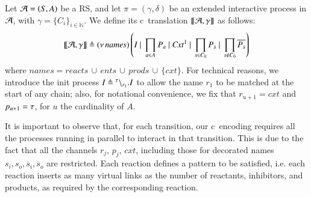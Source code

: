 \begin{definition}[Translation]
\label{def:trans}
Let ${\cal A} = (S, A)$ be a RS, and let $\pi=(\gamma,\delta)$ be an extended interactive process in ${\cal A}$, with  $\gamma=\{C_i\}_{i\in\mathbb{N}}$. 
We define its c\CNA~translation $\llbracket{\cal A},\gamma \rrbracket$ as follows: 
$$
\llbracket{\cal A},\gamma \rrbracket 
\triangleq
 (\nu\, \mathit{names})\left(I ~|~ \prod_{a\in A} P_a ~|~  \mathit{Cxt}^1 ~|~\prod_{s\in C_0}P_{s} ~|~ \prod_{s \notin C_0}\overline{P_s}\right)
$$
where $\mathit{names} = \mathit{reacts}\, \cup\, \mathit{ents}\, \cup \, \mathit{prods}\, \cup\, \{cxt\}$. 
For technical reasons, we introduce the init process $I \triangleq {}^{\tau} \backslash_{r_1}.I$
to allow the name $r_1$ to be matched at the start of any chain; also, 
for notational convenience, we fix that 
$r_{u+1} = \mathit{cxt}$ and $p_{u+1}=\tau$,  for $u$ the cardinality of $A$.
\end{definition}
 



It is important to observe that,   for each transition, our c\CNA \ encoding requires  all the processes 
running in parallel to  interact in that transition.
This is due to the fact that  all the channels $r_j$, $p_j$, $\mathit{cxt}$, including those for decorated names $s_{i},s_{o},\overline{s}_i,\overline{s}_o$ are  restricted.
Each reaction defines a pattern to be satisfied, i.e. each reaction inserts as many virtual links  as  the number of reactants, inhibitors, and products, as required by the corresponding reaction.


